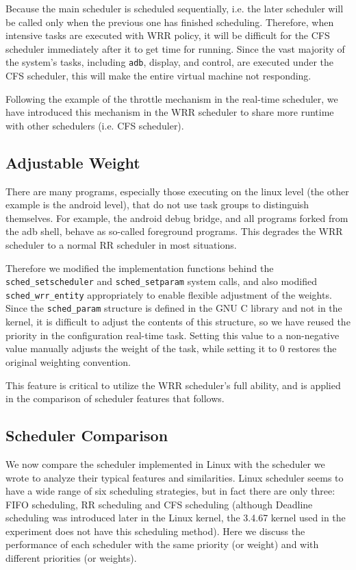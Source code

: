 \documentclass[11pt]{article}
\begin{document}
Because the main scheduler is scheduled sequentially, i.e. the later
scheduler will be called only when the previous one has finished
scheduling. Therefore, when intensive tasks are executed with WRR
policy, it will be difficult for the CFS scheduler immediately after it
to get time for running. Since the vast majority of the system's tasks,
including \texttt{adb}, display, and control, are executed under the CFS
scheduler, this will make the entire virtual machine not responding.

Following the example of the throttle mechanism in the real-time
scheduler, we have introduced this mechanism in the WRR scheduler to
share more runtime with other schedulers (i.e. CFS scheduler).

\subsection{Adjustable Weight}\label{adjustable-weight}

There are many programs, especially those executing on the linux level
(the other example is the android level), that do not use task groups to
distinguish themselves. For example, the android debug bridge, and all
programs forked from the adb shell, behave as so-called foreground
programs. This degrades the WRR scheduler to a normal RR scheduler in
most situations.

Therefore we modified the implementation functions behind the
\texttt{sched\_setscheduler} and \texttt{sched\_setparam} system calls,
and also modified \texttt{sched\_wrr\_entity} appropriately to enable
flexible adjustment of the weights. Since the \texttt{sched\_param}
structure is defined in the GNU C library and not in the kernel, it is
difficult to adjust the contents of this structure, so we have reused
the priority in the configuration real-time task. Setting this value to
a non-negative value manually adjusts the weight of the task, while
setting it to 0 restores the original weighting convention.

This feature is critical to utilize the WRR scheduler's full ability,
and is applied in the comparison of scheduler features that follows.

\subsection{Scheduler Comparison}


We now compare the scheduler implemented in Linux with the scheduler we
wrote to analyze their typical features and similarities. Linux
scheduler seems to have a wide range of six scheduling strategies, but
in fact there are only three: FIFO scheduling, RR scheduling and CFS
scheduling (although Deadline scheduling was introduced later in the
Linux kernel, the 3.4.67 kernel used in the experiment does not have
this scheduling method). Here we discuss the performance of each
scheduler with the same priority (or weight) and with different
priorities (or weights). 
\end{document}
